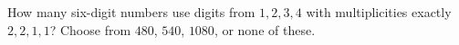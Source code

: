 How many six-digit numbers use digits from $1,2,3,4$ with multiplicities exactly $2,2,1,1$? Choose from $480$, $540$, $1080$, or none of these.
